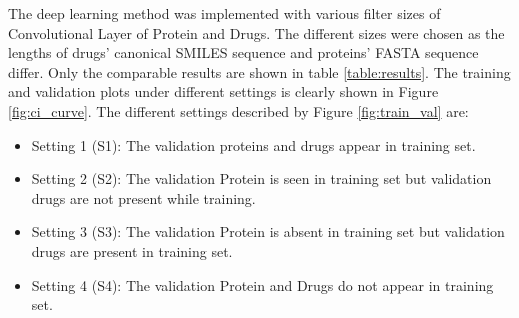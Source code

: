 The deep learning method was implemented with various filter sizes of Convolutional Layer of Protein and Drugs. The different sizes were chosen as the lengths of drugs' canonical SMILES sequence and proteins' FASTA sequence differ. Only the comparable results are shown in table \ref{table:results}. The training and validation plots under different settings is clearly shown in Figure \ref{fig:ci_curve}. The different settings described by Figure \ref{fig:train_val} are:
\begin{itemize}
    \item Setting 1 (S1): The validation proteins and drugs appear in training set.
    \item Setting 2 (S2): The validation Protein is seen in training set but validation drugs are not present while training.
    \item Setting 3 (S3): The validation Protein is absent in training set but validation drugs are present in training set.
    \item Setting 4 (S4): The validation Protein and Drugs do not appear in training set.
\end{itemize}

